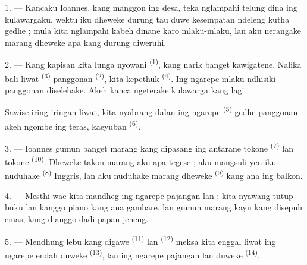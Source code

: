 \VUsaut{4.0mm}
\VUsaut{3.0mm}

\VUsaut{3.0mm}

1. --- Kancaku Ioannes, kang manggon ing desa, teka nglampahi telung
dina ing kulawargaku.  wektu iku dheweke durung tau duwe
kesempatan ndeleng kutha gedhe ; mula kita nglampahi kabeh dinane karo
mlaku-mlaku, lan aku nerangake marang dheweke apa kang durung
diweruhi.

2. --- Kang kapisan kita lunga nyowani 
\textsuperscript{(1)}, kang narik banget kawigatene. Nalika bali liwat
 \textsuperscript{(3)} panggonan 
\textsuperscript{(2)}, kita kepethuk 
\textsuperscript{(4)}. Ing ngarepe  mlaku
 ndhisiki  panggonan
 diselehake. Akeh kanca ngeterake kulawarga kang lagi

Sawise iring-iringan liwat, kita nyabrang dalan ing ngarepe
 \textsuperscript{(5)} gedhe panggonan akeh 
ngombe  ing teras, kaeyuban 
\textsuperscript{(6)}.

3. --- Ioannes gumun banget marang  kang dipasang ing
antarane tokone  \textsuperscript{(7)} lan tokone
 \textsuperscript{(10)}. Dheweke takon marang aku apa
tegese ; aku mangsuli yen iku nuduhake 
\textsuperscript{(8)} Inggris, lan aku nuduhake marang dheweke
 \textsuperscript{(9)} kang ana ing balkon.

\VUsaut{3.0mm}

4. --- Mesthi wae kita mandheg ing ngarepe pajangan 
  lan  ; kita nyawang
tutup buku  lan  kanggo piano kang ana
gambare, lan gumun marang  kayu kang disepuh emas, kang
dianggo dadi papan jeneng.

5. --- Mendhung lebu kang digawe  \textsuperscript{(11)}
lan  \textsuperscript{(12)} meksa kita enggal liwat ing
ngarepe  endah duweke 
\textsuperscript{(13)}, lan ing ngarepe pajangan  lan
 duweke  \textsuperscript{(14)}.

